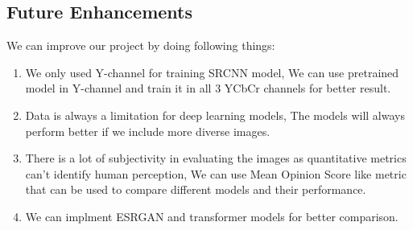 \subsection{Future Enhancements}
We can improve our project by doing following things:
\begin{enumerate}
    \item We only used Y-channel for training SRCNN model, We can use pretrained model in Y-channel and train it in all 3 YCbCr channels for better result.
    \item Data is always a limitation for deep learning models, The models will always perform better if we include more diverse images.
    \item There is a lot of subjectivity in evaluating the images as quantitative metrics can't identify human perception, We can use Mean Opinion Score like metric that can be used to compare different models and their performance.
    \item  We can implment ESRGAN and transformer models for better comparison.
\end{enumerate}
